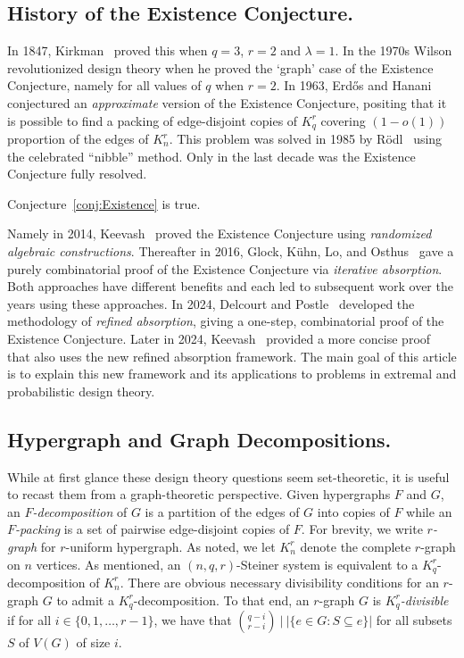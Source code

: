 \documentclass[twoside,leqno]{article}
\begin{document}
\subsection{History of the Existence Conjecture.}

In 1847, Kirkman~\cite{K47} proved this when $q=3$, $r=2$ and $\lambda=1$. In the 1970s Wilson \cite{WI, WII, WIII} revolutionized design theory when he proved the `graph' case of the Existence Conjecture, namely for all values of $q$ when $r = 2$. In 1963, Erd\H{o}s and Hanani~\cite{EH63} conjectured an {\em approximate} version of the Existence Conjecture, positing that it is possible to find a packing of edge-disjoint copies of $K_q^r$ covering $(1-o(1))$ proportion of the edges of $K_n^r$. This problem was solved in 1985 by R\"{o}dl~\cite{R85} using the celebrated ``nibble'' method. Only in the last decade was the Existence Conjecture fully resolved.

\begin{thm}\label{thm:Existence}
Conjecture~\ref{conj:Existence} is true.   
\end{thm}

Namely in 2014, Keevash~\cite{K14} proved the Existence Conjecture using \emph{randomized algebraic constructions}. Thereafter in 2016, Glock, K\"{u}hn, Lo, and Osthus~\cite{GKLO16} gave a purely combinatorial proof of the Existence Conjecture via \emph{iterative absorption}. Both approaches have different benefits and each led to subsequent work over the years using these approaches. In 2024, Delcourt and Postle~\cite{DPI} developed the methodology of {\em refined absorption}, giving a one-step, combinatorial proof of the Existence Conjecture. Later in 2024, Keevash~\cite{K24} provided a more concise proof that also uses the new refined absorption framework. The main goal of this article is to explain this new framework and its applications to problems in extremal and probabilistic design theory.

\subsection{Hypergraph and Graph Decompositions.} While at first glance these design theory questions seem set-theoretic, it is useful to recast them from a graph-theoretic perspective. Given hypergraphs $F$ and $G$, an \emph{$F$-decomposition} of $G$ is a partition of the edges of $G$ into copies of $F$ while an \emph{$F$-packing} is a set of pairwise edge-disjoint copies of $F$. For brevity, we write \emph{$r$-graph} for $r$-uniform hypergraph. As noted, we let $K_n^r$ denote the complete $r$-graph on $n$ vertices. As mentioned, an $(n,q,r)$-Steiner system is equivalent to a $K_q^r$-decomposition of $K_n^r$. There are obvious necessary divisibility conditions for an $r$-graph $G$ to admit a $K_q^r$-decomposition. To that end, an $r$-graph $G$ is \emph{$K_q^r$-divisible} if for all $i\in \{0,1,\ldots, r-1\}$, we have that $\binom{q-i}{r-i}~|~|\{e\in G: S\subseteq e\}|$ for all subsets $S$ of $V(G)$ of size $i$.
\end{document}
